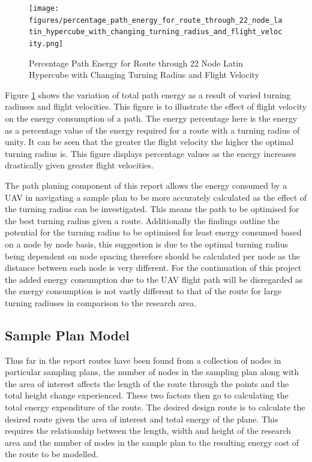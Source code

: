 \documentclass[a4paper,12pt,twoside]{article}
\begin{document}
\begin{figure}
\centering
\texttt{[image: figures/percentage\_path\_energy\_for\_route\_through\_22\_node\_latin\_hypercube\_with\_changing\_turning\_radius\_and\_flight\_velocity.png]} 
\caption{Percentage Path Energy for Route through 22 Node Latin Hypercube with Changing Turning Radius and Flight Velocity}
\label{fig:percentage_path_energy_for_route_through_22_node_latin_hypercube_with_changing_turning_radius_and_flight_velocity}
\end{figure}

Figure \ref{fig:percentage_path_energy_for_route_through_22_node_latin_hypercube_with_changing_turning_radius_and_flight_velocity} shows the variation of total path energy as a result of varied turning radiuses and flight velocities. This figure is to illustrate the effect of flight velocity on the energy consumption of a path. The energy percentage here is the energy as a percentage value of the energy required for a route with a turning radius of unity. It can be seen that the greater the flight velocity the higher the optimal turning radius is. This figure displays percentage values as the energy increases drastically given greater flight velocities.

The path planing component of this report allows the energy consumed by a UAV in navigating a sample plan to be more accurately calculated as the effect of the turning radius can be investigated. This means the path to be optimised for the best turning radius given a route. Additionally the findings outline the potential for the turning radius to be optimised for least energy consumed based on a node by node basis, this suggestion is due to the optimal turning radius being dependent on node spacing therefore should be calculated per node as the distance between each node is very different. For the continuation of this project the added energy consumption due to the UAV flight path will be disregarded as the energy consumption is not vastly different to that of the route for large turning radiuses in comparison to the research area.

\subsection{Sample Plan Model}
\label{sec:sample_plan_model}

Thus far in the report routes have been found from a collection of nodes in particular sampling plans, the number of nodes in the sampling plan along with the area of interest affects the length of the route through the points and the total height change experienced. These two factors then go to calculating the total energy expenditure of the route. The desired design route is to calculate the desired route given the area of interest and total energy of the plane. This requires the relationship between the length, width and height of the research area and the number of nodes in the sample plan to the resulting energy cost of the route to be modelled.
\end{document}
